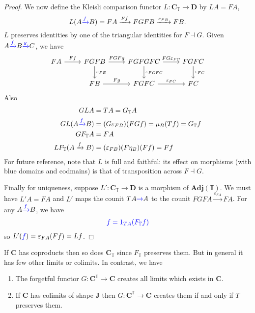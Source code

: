 \documentclass[a4paper]{article}
\renewcommand{\c}[1]{\mathbf{#1}}
\newcommand{\adjoint}{\dashv}
\newcommand{\T}{{\mathbb{T}}} %
\newcommand{\blue}[1]{\textcolor{blue}{#1}}
\begin{document}
\begin{proof}
  We now define the Kleisli comparison functor \(L: \c C _\T \to \c D\) by \(LA = FA\),
  \[
    L(A \blue{\xrightarrow{f}} B) = FA \xrightarrow{Ff} FGFB \xrightarrow{\varepsilon_{FB}} FB.
  \]
  \(L\) preserves identities by one of the triangular identities for \(F \adjoint G\). Given \(A \blue{\xrightarrow{f}} B \blue{\xrightarrow{g}} C\), we have
  \[
    \begin{tikzcd}
      FA \ar[r, "Ff"] & FGFB \ar[r, "FGFg"] \ar[d, "\varepsilon_{FB}"] & FGFGFC \ar[r, "FG\varepsilon_{FC}"] \ar[d, "\varepsilon_{FGFC}"] & FGFC \ar[d, "\varepsilon_{FC}"] \\
      & FB \ar[r, "Fg"] & FGFC \ar[r, "\varepsilon_{FC}"] & FC
    \end{tikzcd}
  \]
  Also
  \begin{align*}
    GLA &= TA = G_\T A \\
    GL(A \blue{\xrightarrow{f}} B) &= (G \varepsilon_{FB}) (FGf) = \mu_B(Tf) = G_\T f \\
    GF_\T A &= FA \\
    LF_\T(A \xrightarrow{f} B) &= (\varepsilon_{FB}) (F\eta_B) (Ff) = Ff
  \end{align*}
  For future reference, note that \(L\) is full and faithful: its effect on morphisms (with blue domains and codmains) is that of transposition across \(F \adjoint G\).

  Finally for uniqueness, suppose \(L': \c C_\T \to \c D\) is a morphism of \(\c{Adj}(\T)\). We must have \(L'A = FA\) and \(L'\) maps the counit \(TA \blue{\to} A\) to the counit \(FGFA \xrightarrow{\varepsilon_{FA}} FA\). For any \(A \blue{\xrightarrow{f}} B\), we have
  \begin{align*}
    \blue{f = 1_{TA}(F_\T f)}
  \end{align*}
  so \(L'(\blue{f}) = \varepsilon_{FA} (Ff) = Lf\).
\end{proof}

If \(\c C\) has coproducts then so does \(\c C_\T\) since \(F_\T\) preserves them. But in general it has few other limits or colimits. In contrast, we have

\begin{theorem}\leavevmode
  \begin{enumerate}
  \item The forgetful functor \(G: \c C^\T \to \c C\) creates all limits which exists in \(\c C\).
  \item If \(\c C\) has colimits of shape \(\c J\) then \(G: \c C^\T \to \c C\) creates them if and only if \(T\) preserves them.
  \end{enumerate}
\end{theorem}
\end{document}
